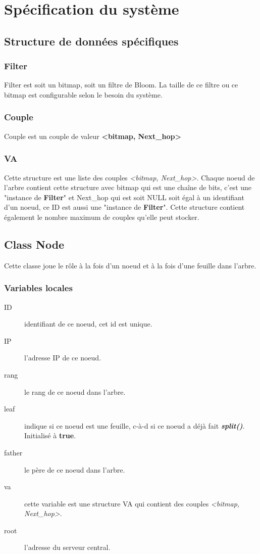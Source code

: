 \documentclass[a4paper,11pt]{report}
\begin{document}
\chapter{Spécification du système}
\section{Structure de données spécifiques}

\subsection{Filter}
	Filter est soit un bitmap, soit un filtre de Bloom. La taille de ce filtre ou ce bitmap est configurable selon le besoin du système. 
	
\subsection{Couple}
	Couple est un couple de valeur \textbf{<bitmap, Next\_hop>}	
	
\subsection{VA}
	Cette structure est une liste des couples \textit{<bitmap, Next\_hop>}. Chaque noeud de l'arbre contient cette structure avec bitmap qui est une chaîne de bits, c'est une "instance de \textbf{Filter}" et Next\_hop qui est soit NULL soit égal à un identifiant d'un noeud, ce ID est aussi une "instance de \textbf{Filter}". Cette structure contient également le nombre maximum de couples qu'elle peut stocker. 
	
\section{Class Node}
	Cette classe joue le rôle à la fois d'un noeud et à la fois d'une feuille dans l'arbre.
	
\subsection{Variables locales}
	\begin{description}
		\item[ID] identifiant de ce noeud, cet id est unique.
		\item[IP] l'adresse IP de ce noeud.
		\item[rang] le rang de ce noeud dans l'arbre.
		\item[leaf] indique si ce noeud est une feuille, c-à-d si ce noeud a déjà fait \textbf{\textit{split()}}. Initialisé à \textbf{true}.
		\item[father] le père de ce noeud dans l'arbre.
		\item[va] cette variable est une structure VA qui contient des couples \textit{<bitmap, Next\_hop>}.
		\item[root] l'adresse du serveur central.
	\end{description}
	
\end{document}
